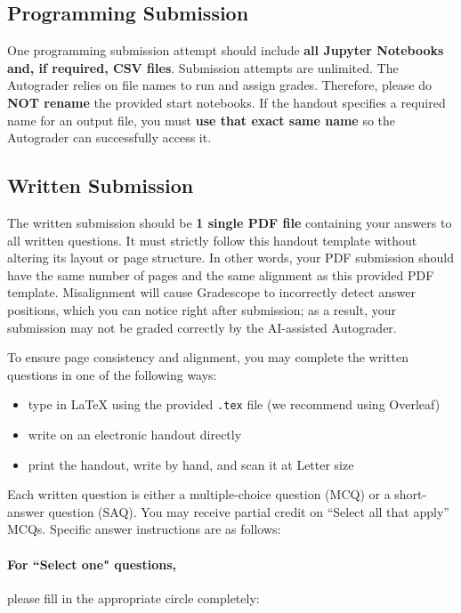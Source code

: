 \documentclass[11pt, letter, answers]{exam}
\begin{document}
\subsection*{Programming Submission}
One programming submission attempt should include \textbf{all Jupyter Notebooks and, if required, CSV files}. Submission attempts are unlimited. The Autograder relies on file names to run and assign grades. Therefore, please do \textbf{NOT rename} the provided start notebooks. If the handout specifies a required name for an output file, you must \textbf{use that exact same name} so the Autograder can successfully access it.

\subsection*{Written Submission}
The written submission should be \textbf{1 single PDF file} containing your answers to all written questions. It must strictly follow this handout template without altering its layout or page structure. In other words, your PDF submission should have the same number of pages and the same alignment as this provided PDF template. Misalignment will cause Gradescope to incorrectly detect answer positions, which you can notice right after submission; as a result, your submission may not be graded correctly by the AI-assisted Autograder. 

To ensure page consistency and alignment, you may complete the written questions in one of the following ways:

\begin{itemize}
\item type in \LaTeX{} using the provided \texttt{.tex} file (we recommend using Overleaf)
\item write on an electronic handout directly
\item print the handout, write by hand, and scan it at Letter size
\end{itemize}

Each written question is either a multiple-choice question (MCQ) or a short-answer question (SAQ). You may receive partial credit on ``Select all that apply'' MCQs. Specific answer instructions are as follows:

\paragraph{For ``Select one" questions,} please fill in the appropriate circle completely:
\end{document}
